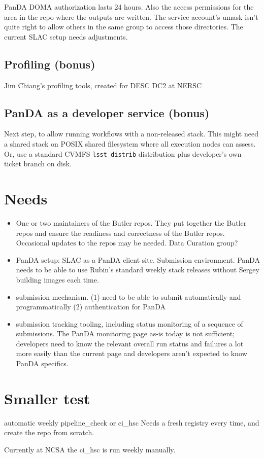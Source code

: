PanDA DOMA authorization lasts 24 hours.  Also the access permissions for the area in the repo where the outputs are written.  The service account's umask isn't quite right to allow others in the same group to access those directories.  The current SLAC setup needs adjustments. 


\subsection{Profiling (bonus)}
Jim Chiang’s profiling tools, created for DESC DC2 at NERSC

\subsection{PanDA as a developer service (bonus)}
Next step,  to allow running workflows with a non-released stack.
This might need a shared stack on POSIX shared filesystem where all execution nodes can assess.
Or, use a standard CVMFS \texttt{lsst\_distrib} distribution plus developer's own ticket branch on disk.



\section{Needs}
\begin{itemize}
\item One or two maintainers of the Butler repos. They put together the Butler repos and ensure the readiness and correctness of the Butler repos. Occasional updates to the repos may be needed. Data Curation group?
\item PanDA setup: SLAC as a PanDA client site. Submission environment.
PanDA needs to be able to use Rubin's standard weekly stack releases without Sergey building images each time.
\item submission mechanism. (1) need to be able to submit automatically and programmatically 
(2) authentication for PanDA 
\item submission tracking tooling, including status monitoring of a sequence of submissions. The PanDA monitoring page as-is today is not sufficient; developers need to know the relevant overall run status and failures a lot more easily than the current page and developers aren't expected to know PanDA specifics.
\end{itemize}


\section{Smaller test}
automatic weekly pipeline\_check or ci\_hsc
Needs a fresh registry every time, and create the repo from scratch.

Currently at NCSA the ci\_hsc is run weekly manually.
